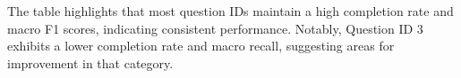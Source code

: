 The table highlights that most question IDs maintain a high completion rate and macro F1 scores, indicating consistent performance. Notably, Question ID 3 exhibits a lower completion rate and macro recall, suggesting areas for improvement in that category. 

       
       

